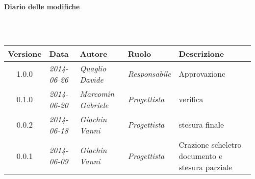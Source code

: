 \noindent\begin{Large}\textbf{Diario delle modifiche}\end{Large}\\
\\
\begin{small}
\begin{tabular}{|c|p{1.8cm}|p{2.8cm}|p{2.8cm}|p{3.5cm}|}
\hline
Versione & Data & Autore & Ruolo & Descrizione \\
\hline
\hline
1.0.0 & \textit{2014-06-26} & \textit{Quaglio Davide} & \textit{Responsabile} & Approvazione\\
0.1.0 & \textit{2014-06-20} & \textit{Marcomin Gabriele} & \textit{Progettista} & verifica\\
0.0.2 & \textit{2014-06-18} & \textit{Giachin Vanni} & \textit{Progettista} & stesura finale\\
0.0.1 & \textit{2014-06-09} & \textit{Giachin Vanni} & \textit{Progettista} & Crazione scheletro documento e stesura parziale\\
\hline
\end{tabular}\\
\end{small}
